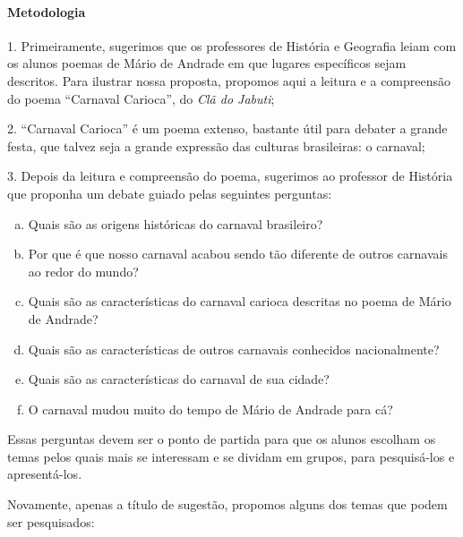 \documentclass[11pt]{extarticle}
\begin{document}
\paragraph{Metodologia}


1. Primeiramente, sugerimos que os professores de História e Geografia
leiam com os alunos poemas de Mário de Andrade em que lugares
específicos sejam descritos. Para ilustrar nossa proposta, propomos aqui
a leitura e a compreensão do poema ``Carnaval Carioca'', do \emph{Clã do
Jabuti};

2. ``Carnaval Carioca'' é um poema extenso, bastante útil para debater a
grande festa, que talvez seja a grande expressão das culturas
brasileiras: o carnaval;

3. Depois da leitura e compreensão do poema, sugerimos ao professor de
História que proponha um debate guiado pelas seguintes perguntas:

\begin{enumerate}[(a)]  

\item Quais são as origens históricas do carnaval brasileiro?

\item Por que é que nosso carnaval acabou sendo tão diferente de outros
carnavais ao redor do mundo?

\item Quais são as características do carnaval carioca descritas no poema
de Mário de Andrade?

\item Quais são as características de outros carnavais conhecidos
nacionalmente?

\item Quais são as características do carnaval de sua cidade?

\item O carnaval mudou muito do tempo de Mário de Andrade para cá?

\end{enumerate} 

Essas perguntas devem ser o ponto de partida para que os alunos escolham
os temas pelos quais mais se interessam e se dividam em grupos, para
pesquisá-los e apresentá-los.

Novamente, apenas a título de sugestão, propomos alguns dos temas que
podem ser pesquisados:
\end{document}
